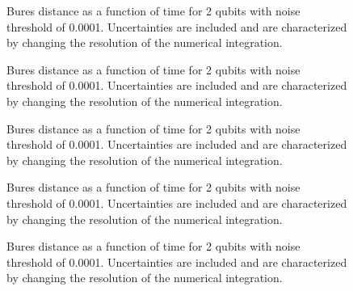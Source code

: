 \begin{figure}
\begin{center}
\end{center}
\caption{Bures distance as a function of time for 2 qubits with noise
threshold of 0.0001.  Uncertainties are included and are characterized 
by changing the resolution of the numerical integration.}
\end{figure}

\begin{figure}
\begin{center}
\end{center}
\caption{Bures distance as a function of time for 2 qubits with noise
threshold of 0.0001.  Uncertainties are included and are characterized 
by changing the resolution of the numerical integration.}
\end{figure}

\begin{figure}
\begin{center}
\end{center}
\caption{Bures distance as a function of time for 2 qubits with noise
threshold of 0.0001.  Uncertainties are included and are characterized 
by changing the resolution of the numerical integration.}
\end{figure}

\begin{figure}
\begin{center}
\end{center}
\caption{Bures distance as a function of time for 2 qubits with noise
threshold of 0.0001.  Uncertainties are included and are characterized 
by changing the resolution of the numerical integration.}
\end{figure}

\begin{figure}
\begin{center}
\end{center}
\caption{Bures distance as a function of time for 2 qubits with noise
threshold of 0.0001.  Uncertainties are included and are characterized 
by changing the resolution of the numerical integration.}
\end{figure}


